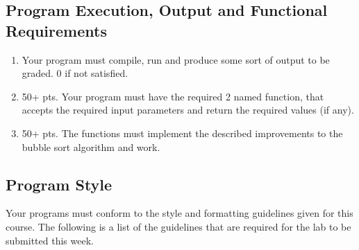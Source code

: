 \documentclass[11pt]{article}
\begin{document}
\subsection*{Program Execution, Output and Functional Requirements}
\label{sec-5-1}


\begin{enumerate}
\item Your program must compile, run and produce some sort of output to be
  graded. 0 if not satisfied.
\item 50+ pts.  Your program must have the required 2 named function,
   that accepts the required input parameters and return the required
   values (if any).
\item 50+ pts. The functions must implement the described improvements
   to the bubble sort algorithm and work.
\end{enumerate}
\subsection*{Program Style}
\label{sec-5-2}


Your programs must conform to the style and formatting guidelines given for this course.
The following is a list of the guidelines that are required for the lab to be submitted
this week.
\end{document}
